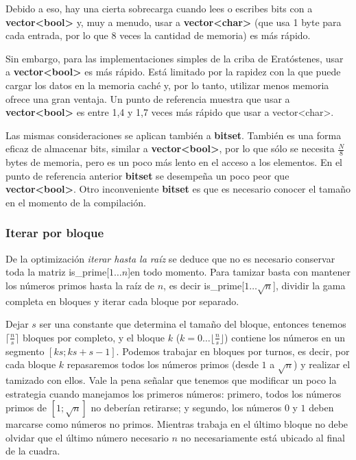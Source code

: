Debido a eso, hay una cierta sobrecarga cuando lees o escribes bits con a \textbf{vector<bool>} y, muy a menudo, usar a \textbf{vector<char>} (que usa 1 byte para cada entrada, por lo que 8 veces la cantidad de memoria) es más rápido.

Sin embargo, para las implementaciones simples de la criba de Eratóstenes, usar a \textbf{vector<bool>} es más rápido. Está limitado por la rapidez con la que puede cargar los datos en la memoria caché y, por lo tanto, utilizar menos memoria ofrece una gran ventaja. Un punto de referencia muestra que usar a \textbf{vector<bool>} es entre 1,4 y 1,7 veces más rápido que usar a vector<char>.

Las mismas consideraciones se aplican también a \textbf{bitset}. También es una forma eficaz de almacenar bits, similar a \textbf{vector<bool>}, por lo que sólo se necesita $\frac{N}{8}$ bytes de memoria, pero es un poco más lento en el acceso a los elementos. En el punto de referencia anterior \textbf{bitset} se desempeña un poco peor que \textbf{vector<bool>}. Otro inconveniente \textbf{bitset} es que es necesario conocer el tamaño en el momento de la compilación.

\subsubsection{Iterar por bloque}

De la optimización \emph{iterar hasta la raíz} se deduce que no es necesario conservar toda la matriz is\_prime[$1 \dots n$]en todo momento. Para tamizar basta con mantener los números primos hasta la raíz de $n$, es decir is\_prime[$1 \dots \sqrt n$], dividir la gama completa en bloques y iterar cada bloque por separado.

Dejar $s$ ser una constante que determina el tamaño del bloque, entonces tenemos $\lceil {\frac ns} \rceil$ bloques por completo, y el bloque $k$ ($k = 0 \dots \lfloor {\frac ns} \rfloor$) contiene los 
números en un segmento $[ks;ks+s-1]$. Podemos trabajar en bloques por turnos, es decir, por cada 
bloque $k$ repasaremos todos los números primos (desde $1$ a $\sqrt n$) y realizar el tamizado con 
ellos. Vale la pena señalar que tenemos que modificar un poco la estrategia cuando manejamos los 
primeros números: primero, todos los números primos de $[1;\sqrt n]$ no deberían retirarse; y 
segundo, los números $0$ y $1$ deben marcarse como números no primos. Mientras trabaja en el último 
bloque no debe olvidar que el último número necesario $n$ no necesariamente está ubicado al final de 
la cuadra.

